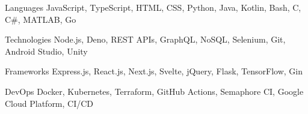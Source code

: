 

\begin{cvskills}

  \cvskill
    {Languages} %
    {JavaScript, TypeScript, HTML, CSS, Python, Java, Kotlin, Bash, C, C\#, MATLAB, Go } %

  \cvskill
    {Technologies} %
    {Node.js, Deno, REST APIs, GraphQL, NoSQL, Selenium, Git, Android Studio, Unity} %

  \cvskill
    {Frameworks} %
    {Express.js, React.js, Next.js, Svelte, jQuery, Flask, TensorFlow, Gin} %

  \cvskill
    {DevOps} %
    {Docker, Kubernetes, Terraform, GitHub Actions, Semaphore CI, Google Cloud Platform, CI/CD} %

\end{cvskills}
